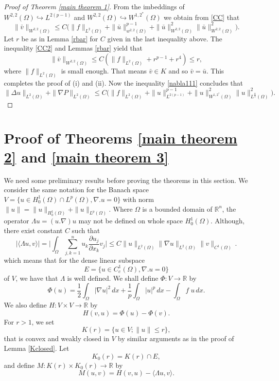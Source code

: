 \documentclass[reqno]{amsart}
\begin{document}
\begin{proof}[Proof of Theorem \ref{main theorem 1}]
From the  imbeddings of  \(W^{2,2}(\Omega)\hookrightarrow L^{2(p-1)}\) and
\(W^{2,2}(\Omega)\hookrightarrow W^{1,2^*}(\Omega)\)  we obtain from \eqref{CC}
that
\begin{equation}\label{CC2}
  \rVert \bar{v} \rVert_{ W^{2,2}(\Omega)}
  \leq C\big( \rVert f\rVert_{L^2(\Omega)}+\rVert \bar{u}\rVert^{p-1}_{w^{2,2}(\Omega)}
  +\rVert \bar{u}\rVert^{2}_{W^{2,2}(\Omega)} \rVert  \bar{u}\rVert^2_{W^{2,2}(\Omega)}
  \big).
\end{equation}
Let $r$ be as in Lemma \ref{rbar} for $C$ given in the last inequality above.
The inequality \eqref{CC2} and Lemmas \ref{rbar} yield that
\[
  \rVert \bar{v} \rVert_{ W^{2,2}(\Omega)}
\leq   C(\rVert f\rVert_{L^2(\Omega)} +{r}^{p-1}+{r}^4)\leq {r},
\]
where \(\rVert f\rVert_{L^2(\Omega)}\) is small enough.
That means \( \bar{v}\in K\) and so $\bar{v}=\bar{u}$.
This completes the proof of (i) and (ii).
Now  the inequality \eqref{nabla111}  concludes that
  \begin{equation} \label{nabla11}
  \rVert \Delta {u} \rVert_{L^2(\Omega)}+\rVert \nabla P \rVert_{L^2(\Omega)}
  \leq C\big( \rVert f\rVert_{L^2(\Omega)}+\rVert u\rVert^{p-1}_{L^{2(p-1)}}
  +\rVert {u}\rVert^{2}_{W^{1,2^*}(\Omega)}
  \rVert  {u}\rVert^2_{L^{\frac{n}{2}}(\Omega)} \big) .
\end{equation}
\end{proof}

\section{Proof of Theorems \ref{main theorem 2} and \ref{main theorem 3}}

We need some preliminary results before proving  the theorems in this section.
We consider  the same notation  for the Banach space
\( V= \{ u\in H_0^1(\Omega)\cap L^p(\Omega),\nabla . u=0\} \)
with norm \( \rVert u \rVert= \rVert u \rVert_{ H_0^{1}(\Omega)}
+\rVert u \rVert_{ L^{p}(\Omega)}\).
Where $\Omega$ is a  bounded domain of $\mathbb{R}^n$, the operator
\(\Lambda u = (u . \nabla)u\) may  not be defined on whole space $H_0^1(\Omega)$.
Although, there exist constant $C$ such  that
\[
 |\langle\Lambda u, v\rangle|  =\Big|\int_\Omega\sum_{j,k=1}^n u_k
 \frac{\partial u_j}{\partial x_k}v_j\Big|
 \leq  C\rVert u \rVert_{L^2(\Omega)}\rVert \nabla u \rVert_{L^2(\Omega)}
  \rVert v \rVert_{C^1(\Omega)}\,.
\]
which means that for the dense linear subspace
\[
E = \{ u\in C_c^1(\Omega),\nabla .  u=0\}
\]
of $V$, we have that $\Lambda$ is well defined.
We shall define \(\Phi: V\to\mathbb{R}\)  by
\[
\Phi(u)= \frac{1}{2}\int_{\Omega} |\nabla u|^2\,dx+\frac{1}{p}\int_\Omega
|u|^{p}\,dx -\int_{\Omega} f\;u\,dx.
\]
We also define \(H:  V \times  V \to\mathbb{R}\)  by
\[
H(v, u) = \Phi(u) -\Phi(v).
\]
For \(r > 1\), we set
\[
K(r) = \{u\in V; \rVert u\rVert \leq  r\},
\]
that is convex and  weakly closed in \(V\) by similar arguments as in the proof
of Lemma \ref{Kclosed}. Let
\[
K_0(r) = K(r) \cap E,
\]
and define \(M : K(r) \times K_0(r) \to\mathbb{R}\) by
\begin{equation}\label{defM2}
  M(u, v) = H(v, u) -\langle \Lambda u,v \rangle.
\end{equation}
\end{document}
